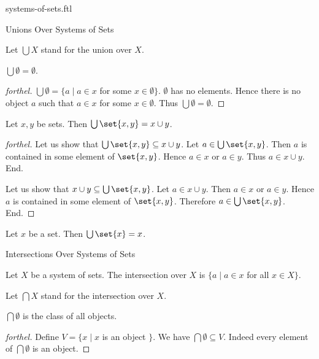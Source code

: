 \documentclass{naproche-library}
\begin{document}
\begin{smodule}[title=Systems of Sets]{systems-of-sets.ftl}
\begin{sfragment}{Unions Over Systems of Sets}
\begin{definition}[forthel,id=FOUNDATIONS_10_541772562300928]
    Let $\bigcup X$ stand for the union over $X$.
  \end{definition}

  \begin{proposition}[forthel,id=FOUNDATIONS_10_4872701241982976]
    $\bigcup \emptyset = \emptyset$.
  \end{proposition}
  \begin{proof}[forthel]
    $\bigcup \emptyset = \{ a \mid a \in x$ for some $x \in \emptyset \}$.
    $\emptyset$ has no elements.
    Hence there is no object $a$ such that $a \in x$ for some $x \in \emptyset$.
    Thus $\bigcup \emptyset = \emptyset$.
  \end{proof}

  \begin{proposition}[forthel,id=FOUNDATIONS_10_2559541585641472]
    Let $x, y$ be sets.
    Then $\bigcup \set{x, y} = x \cup y$.
  \end{proposition}
  \begin{proof}[forthel]
    Let us show that $\bigcup \set{x, y} \subseteq x \cup y$.
      Let $a \in \bigcup \set{x, y}$.
      Then $a$ is contained in some element of $\set{x, y}$.
      Hence $a \in x$ or $a \in y$.
      Thus $a \in x \cup y$.
    End.

    Let us show that $x \cup y \subseteq \bigcup \set{x, y}$.
      Let $a \in x \cup y$.
      Then $a \in x$ or $a \in y$.
      Hence $a$ is contained in some element of $\set{x, y}$.
      Therefore $a \in \bigcup \set{x, y}$.
    End.
  \end{proof}

  \begin{corollary}[forthel,id=FOUNDATIONS_10_2157223832715264]
    Let $x$ be a set.
    Then $\bigcup \set{x} = x$.
  \end{corollary}
\end{sfragment}

\begin{sfragment}{Intersections Over Systems of Sets}
  \begin{definition}[forthel,id=FOUNDATIONS_10_2659345095458816]
    Let $X$ be a system of sets.
    The intersection over $X$ is $\{ a \mid a \in x$ for all $x \in X \}$.

    Let $\bigcap X$ stand for the intersection over $X$.
  \end{definition}

  \begin{proposition}[forthel,id=FOUNDATIONS_10_2809770322952192]
    $\bigcap \emptyset$ is the class of all objects.
  \end{proposition}
  \begin{proof}[forthel]
    Define $V = \{ x \mid x$ is an object $\}$.
    We have $\bigcap \emptyset \subseteq V$.
    Indeed every element of $\bigcap \emptyset$ is an object.


\end{proof}
\end{sfragment}
\end{smodule}
\end{document}

